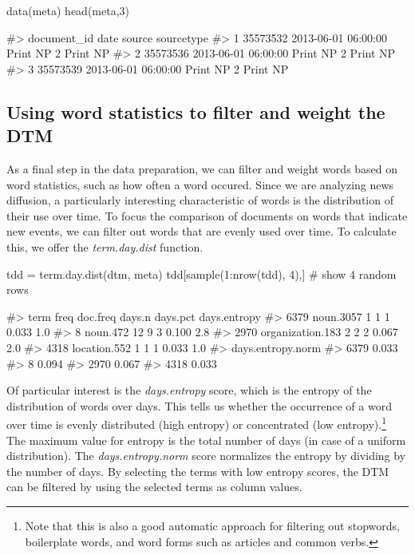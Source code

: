 \begin{Schunk}
\begin{Sinput}
data(meta)
head(meta,3)
\end{Sinput}
\begin{Soutput}
#>   document_id                date     source sourcetype
#> 1    35573532 2013-06-01 06:00:00 Print NP 2   Print NP
#> 2    35573536 2013-06-01 06:00:00 Print NP 2   Print NP
#> 3    35573539 2013-06-01 06:00:00 Print NP 2   Print NP
\end{Soutput}
\end{Schunk}

\subsection{Using word statistics to filter and weight the DTM}

As a final step in the data preparation, we can filter and weight words
based on word statistics, such as how often a word occured. Since we are
analyzing news diffusion, a particularly interesting characteristic of
words is the distribution of their use over time. To focus the
comparison of documents on words that indicate new events, we can filter
out words that are evenly used over time. To calculate this, we offer
the \emph{term.day.dist} function.

\begin{Schunk}
\begin{Sinput}
tdd = term.day.dist(dtm, meta)
tdd[sample(1:nrow(tdd), 4),] # show 4 random rows
\end{Sinput}
\begin{Soutput}
#>                  term freq doc.freq days.n days.pct days.entropy
#> 6379        noun.3057    1        1      1    0.033          1.0
#> 8            noun.472   12        9      3    0.100          2.8
#> 2970 organization.183    2        2      2    0.067          2.0
#> 4318     location.552    1        1      1    0.033          1.0
#>      days.entropy.norm
#> 6379             0.033
#> 8                0.094
#> 2970             0.067
#> 4318             0.033
\end{Soutput}
\end{Schunk}

Of particular interest is the \emph{days.entropy} score, which is the
entropy of the distribution of words over days. This tells us whether
the occurrence of a word over time is evenly distributed (high entropy)
or concentrated (low entropy).\footnote{Note that this is also a good
  automatic approach for filtering out stopwords, boilerplate words, and
  word forms such as articles and common verbs.} The maximum value for
entropy is the total number of days (in case of a uniform distribution).
The \emph{days.entropy.norm} score normalizes the entropy by dividing by
the number of days. By selecting the terms with low entropy scores, the
DTM can be filtered by using the selected terms as column values.

